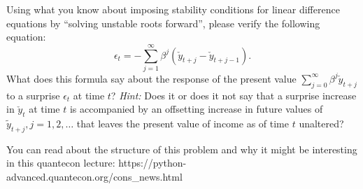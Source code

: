  
 
 
 \medskip
{}  Using what you know about imposing stability conditions for  linear difference equations by ``solving unstable roots forward'', please verify the following equation:
$$ \epsilon_t = - \sum_{j=1}^\infty \beta^j (\check y_{t+j} - \check y_{t+j-1}) . $$ 
What does this formula say about the response of the present value $\sum_{j=0}^\infty\beta^j \check y_{t+j}$ to a surprise $\epsilon_t$ at time $t$?
{\it Hint:} Does it or does it not say that a surprise increase in $\check y_t$ at time $t$ is accompanied by an offsetting increase in future values of $\tilde y_{t+j},
j = 1, 2, \ldots$ that leaves the present value of income as of time $t$ unaltered?

\medskip
{} You can read about the structure of this problem and why it might be interesting in this quantecon lecture: https://python-advanced.quantecon.org/cons\_news.html





 




\bye




